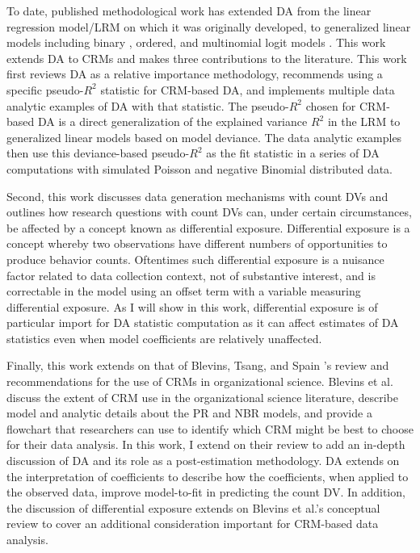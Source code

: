\documentclass[ShortAfour,times,sageapa]{sagej}
\begin{document}
	To date, published methodological work has extended DA from the linear regression model/LRM on which it was originally developed, to generalized linear models including binary \cite{azen2009using}, ordered, and multinomial logit models \cite{luchman2014relative}.	
	This work extends DA to CRMs and makes three contributions to the literature.
	This work first reviews DA as a relative importance methodology, recommends using a specific pseudo-$R^2$ statistic for CRM-based DA, and implements multiple data analytic examples of DA with that statistic.
	The pseudo-$R^2$ chosen for CRM-based DA is a direct generalization of the explained variance $R^2$ in the LRM to generalized linear models based on model deviance.
	The data analytic examples then use this deviance-based pseudo-$R^2$ as the fit statistic in a series of DA computations with simulated Poisson and negative Binomial distributed data.
	
	Second, this work discusses data generation mechanisms with count DVs and outlines how research questions with count DVs can, under certain circumstances, be affected by a concept known as differential exposure.
	Differential exposure is a concept whereby two observations have different numbers of opportunities to produce behavior counts.
	Oftentimes such differential exposure is a nuisance factor related to data collection context, not of substantive interest, and is correctable in the model using an offset term with a variable measuring differential exposure.
	As I will show in this work, differential exposure is of particular import for DA statistic computation as it can affect estimates of DA statistics even when model coefficients are relatively unaffected.
	
	Finally, this work extends on that of Blevins, Tsang, and Spain \citeyear{blevins2015count}'s review and recommendations for the use of CRMs in organizational science. 
	Blevins et al. discuss the extent of CRM use in the organizational science literature, describe model and analytic details about the PR and NBR models, and provide a flowchart that researchers can use to identify which CRM might be best to choose for their data analysis.
	In this work, I extend on their review to add an in-depth discussion of DA and its role as a post-estimation methodology.
	DA extends on the interpretation of coefficients to describe how the coefficients, when applied to the observed data, improve model-to-fit in predicting the count DV.
	In addition, the discussion of differential exposure extends on Blevins et al.'s conceptual review to cover an additional consideration important for CRM-based data analysis.
	
\end{document}
